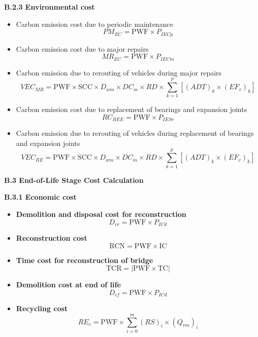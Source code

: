\documentclass[12pt,a4paper]{article}
\begin{document}
\vspace{0.3em}
\textbf{B.2.3 Environmental cost}

\begin{itemize}
  \item Carbon emission cost due to periodic maintenance
    \[ PM_{EC} = \mathrm{PWF} \times P_{IECp} \]
  \item Carbon emission cost due to major repairs
    \[ MR_{EC} = \mathrm{PWF} \times P_{IECm} \]
  \item Carbon emission due to rerouting of vehicles during major repairs
    \[
    VEC_{MR} = \mathrm{PWF} \times \mathrm{SCC} \times D_{wm} \times DC_m \times RD
    \times \sum_{k=1}^{p} \left[(ADT)_k \times (EF_v)_k\right]
    \]
  \item Carbon emission cost due to replacement of bearings and expansion joints
    \[ RC_{BEE} = \mathrm{PWF} \times P_{IESr} \]
  \item Carbon emission due to rerouting of vehicles during replacement of bearings and expansion joints
    \[
    VEC_{RE} = \mathrm{PWF} \times \mathrm{SCC} \times D_{wm} \times DC_m \times RD
    \times \sum_{k=1}^{p} \left[(ADT)_k \times (EF_v)_k\right]
    \]
\end{itemize}

{\bfseries B.3 End-of-Life Stage Cost Calculation}

\vspace{0.3em}
\textbf{B.3.1 Economic cost}

\begin{itemize}
  \item \textbf{Demolition and disposal cost for reconstruction}
    \[ D_{cr} = \mathrm{PWF} \times P_{ICd} \]
  \item \textbf{Reconstruction cost}
    \[ \mathrm{RCN} = \mathrm{PWF} \times \mathrm{IC} \]
  \item \textbf{Time cost for reconstruction of bridge}
    \[ \mathrm{TCR} = \bigl| \mathrm{PWF} \times \mathrm{TC} \bigr| \]
  \item \textbf{Demolition cost at end of life}
    \[ D_{cf} = \mathrm{PWF} \times P_{ICd} \]
  \item \textbf{Recycling cost}
    \[ RE_c = \mathrm{PWF} \times \sum_{i=0}^{m} (RS)_i \times (Q_{rm})_i \]
\end{itemize}
\end{document}
